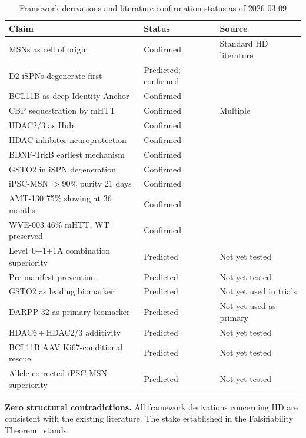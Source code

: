 \documentclass[12pt,a4paper]{article}
\begin{document}
\begin{table}[ht!]
\centering
\caption{Framework derivations and literature confirmation
  status as of 2026-03-09}
\label{tab:record}
\begin{tabular}{p{5.2cm}p{2.2cm}p{4.0cm}}
\toprule
\textbf{Claim} &
\textbf{Status} &
\textbf{Source} \\
\midrule
MSNs as cell of origin &
Confirmed & Standard HD literature \\[2pt]
D2 iSPNs degenerate first &
Predicted; confirmed & \cite{Oxford2024} \\[2pt]
BCL11B as deep Identity Anchor &
Confirmed & \cite{Arlotta2008} \\[2pt]
CBP sequestration by mHTT &
Confirmed & Multiple \\[2pt]
HDAC2/3 as Hub &
Confirmed & \cite{eLife2020} \\[2pt]
HDAC inhibitor neuroprotection &
Confirmed & \cite{HDACiReview2020} \\[2pt]
BDNF-TrkB earliest mechanism &
Confirmed & \cite{Oxford2024} \\[2pt]
GSTO2 in iSPN degeneration &
Confirmed & \cite{Oxford2024} \\[2pt]
iPSC-MSN $>$90\% purity 21 days &
Confirmed & \cite{iPSC_MSN_2024} \\[2pt]
AMT-130 75\% slowing at 36 months &
Confirmed & \cite{AMT130_2025} \\[2pt]
WVE-003 46\% mHTT, WT preserved &
Confirmed & \cite{WVE003_2024} \\
\midrule
Level~0+1+1A combination superiority &
Predicted & Not yet tested \\[2pt]
Pre-manifest prevention &
Predicted & Not yet tested \\[2pt]
GSTO2 as leading biomarker &
Predicted & Not yet used in trials \\[2pt]
DARPP-32 as primary biomarker &
Predicted & Not yet used as primary \\[2pt]
HDAC6\,+\,HDAC2/3 additivity &
Predicted & Not yet tested \\[2pt]
BCL11B AAV Ki67-conditional rescue &
Predicted & Not yet tested \\[2pt]
Allele-corrected iPSC-MSN superiority &
Predicted & Not yet tested \\
\bottomrule
\end{tabular}
\end{table}

\textbf{Zero structural contradictions.} All framework
derivations concerning HD are consistent with the existing
literature. The stake established in the Falsifiability
Theorem~\cite{FalsThm2026} stands.
\end{document}
